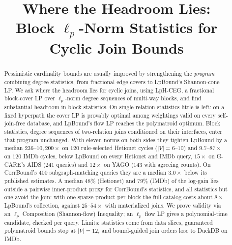 \documentclass[conference]{IEEEtran}
\begin{document}
\raggedbottom

\title{Where the Headroom Lies:\\ Block $\ell_p$-Norm Statistics for Cyclic Join Bounds}

\author{
\and
{}
\and
{}
}

\maketitle

\begin{abstract}
Pessimistic cardinality bounds are usually improved by strengthening
the \emph{program} combining degree statistics, from fractional edge covers to LpBound's Shannon-cone LP. We ask where the headroom lies for cyclic joins, using LpH-CEG, a fractional block-cover LP over $\ell_p$-norm degree
sequences of multi-way blocks, and find substantial headroom in block statistics. On single-relation statistics little is left: on a fixed hyperpath the cover LP is provably optimal among weightings valid on every self-join-free database, and LpBound's flow LP
reaches the polymatroid optimum. Block statistics, degree sequences of
two-relation joins conditioned on their interfaces, enter that program unchanged. With eleven norms on both sides they tighten LpBound by a median
$236$--$10{,}200\times$ on $120$ rule-selected Hetionet cycles ($|V|{=}6$--$10$) and $9.7$--$87\times$ on $120$ IMDb cycles, below LpBound on every
Hetionet and IMDb query, $15\times$ on G-CARE's AIDS ($241$ queries) and
$12\times$ on YAGO ($143$ with agreeing counts). On CorrBound's $400$ subgraph-matching queries they are a median $3.0\times$ below its published estimates. A median $48\%$ (Hetionet) and $79\%$ (IMDb) of the log-gain lies outside a pairwise inner-product proxy for CorrBound's statistics, and all statistics but one avoid the join: with one sparse product per block the full catalog costs about $8\times$ LpBound's collection, against $25$--$54\times$ with materialized joins. We prove validity via an $\ell_p$ Composition (Shannon-flow) Inequality; an $\ell_p$ flow LP gives a polynomial-time candidate, checked per query. Limits:
statistics come from data slices, guaranteed polymatroid bounds stop at $|V|{=}12$,
and bound-guided join orders lose to DuckDB on IMDb.
\end{abstract}
\end{document}

